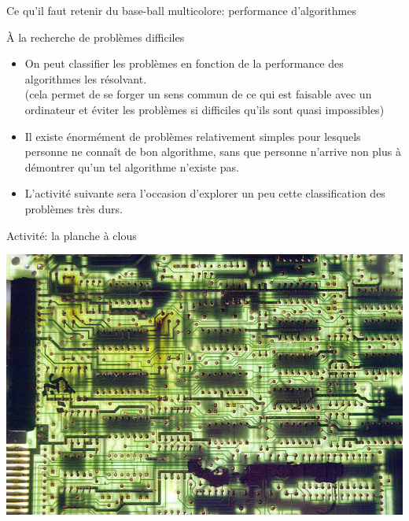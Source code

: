 \documentclass[final,hyperref={pdfpagelabels=false}]{beamer}
\begin{document}
\begin{frame}{Ce qu'il faut retenir du base-ball multicolore: performance d'algorithmes}
  \begin{block}{À la recherche de problèmes difficiles}
    \begin{itemize}
    \item On peut classifier les problèmes en fonction de la performance des
      algorithmes les résolvant. \\
      (cela permet de se forger un sens commun de ce qui est faisable avec un
      ordinateur et éviter les problèmes si difficiles qu'ils sont quasi impossibles)
    \item Il existe énormément de problèmes relativement simples pour lesquels
      personne ne connaît de bon algorithme, sans que personne n'arrive non plus à
      démontrer qu'un tel algorithme n'existe pas.
    \item L'activité suivante sera l'occasion d'explorer un peu cette
      classification des problèmes très durs.
    \end{itemize}
  \end{block}
\end{frame}
\begin{frame}{Activité: la planche à clous}
  
  \centerline{\includegraphics[width=.7\linewidth]{img/electric_city.jpg}\label{img:electric:city}}
\end{frame}
\end{document}

